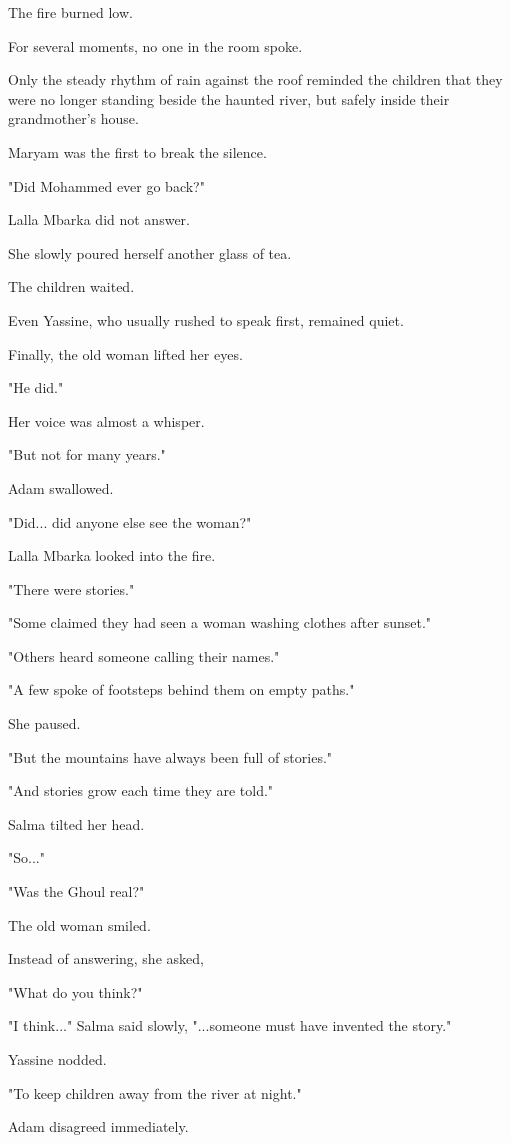 \documentclass[12pt,openany]{book}
\begin{document}
The fire burned low.

For several moments, no one in the room spoke.

Only the steady rhythm of rain against the roof reminded the children that they were no longer standing beside the haunted river, but safely inside their grandmother's house.

Maryam was the first to break the silence.

"Did Mohammed ever go back?"

Lalla Mbarka did not answer.

She slowly poured herself another glass of tea.

The children waited.

Even Yassine, who usually rushed to speak first, remained quiet.

Finally, the old woman lifted her eyes.

"He did."

Her voice was almost a whisper.

"But not for many years."

Adam swallowed.

"Did... did anyone else see the woman?"

Lalla Mbarka looked into the fire.

"There were stories."

"Some claimed they had seen a woman washing clothes after sunset."

"Others heard someone calling their names."

"A few spoke of footsteps behind them on empty paths."

She paused.

"But the mountains have always been full of stories."

"And stories grow each time they are told."

Salma tilted her head.

"So..."

"Was the Ghoul real?"

The old woman smiled.

Instead of answering, she asked,

"What do you think?"

"I think..." Salma said slowly, "...someone must have invented the story."

Yassine nodded.

"To keep children away from the river at night."

Adam disagreed immediately.
\end{document}
